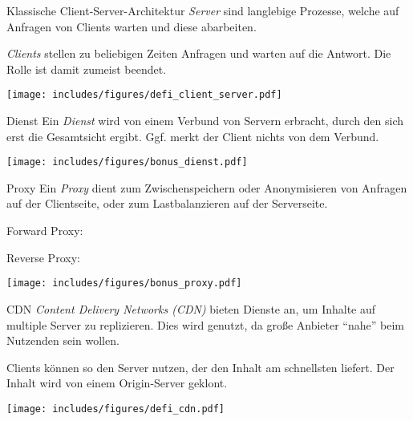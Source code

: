 \begin{defi}{Klassische Client-Server-Architektur}
    \emph{Server} sind langlebige Prozesse, welche auf Anfragen von Clients warten und diese abarbeiten.

    \emph{Clients} stellen zu beliebigen Zeiten Anfragen und warten auf die Antwort.
    Die Rolle ist damit zumeist beendet.

    \begin{center}
        \texttt{[image: includes/figures/defi\_client\_server.pdf]}
    \end{center}
\end{defi}

\begin{bonus}{Dienst}
    Ein \emph{Dienst} wird von einem Verbund von Servern erbracht, durch den sich erst die Gesamtsicht ergibt.
    Ggf. merkt der Client nichts von dem Verbund.

    \begin{center}
        \texttt{[image: includes/figures/bonus\_dienst.pdf]}
    \end{center}
\end{bonus}

\begin{bonus}{Proxy}
    Ein \emph{Proxy} dient zum Zwischenspeichern oder Anonymisieren von Anfragen auf der Clientseite, oder zum Lastbalanzieren auf der Serverseite.

    \begin{minipage}[t]{.5\textwidth}
        Forward Proxy:
    \end{minipage}%
    \begin{minipage}[t]{.5\textwidth}
        Reverse Proxy:
    \end{minipage}

    \texttt{[image: includes/figures/bonus\_proxy.pdf]}
\end{bonus}

\begin{defi}{CDN}
    \emph{Content Delivery Networks (CDN)} bieten Dienste an, um Inhalte auf multiple Server zu replizieren.
    Dies wird genutzt, da große Anbieter \enquote{nahe} beim Nutzenden sein wollen.

    Clients können so den Server nutzen, der den Inhalt am schnellsten liefert.
    Der Inhalt wird von einem Origin-Server geklont.

    \begin{center}
        \texttt{[image: includes/figures/defi\_cdn.pdf]}
    \end{center}
\end{defi}

